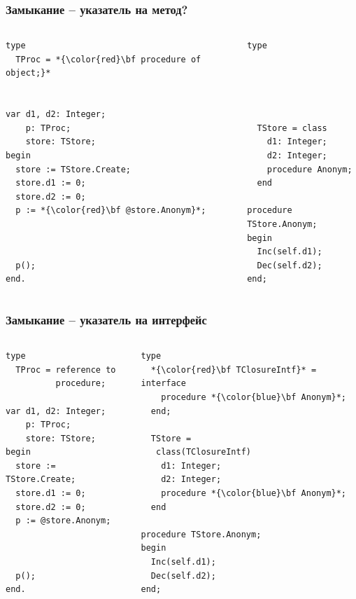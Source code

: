 \documentclass[roman,12pt]{beamer}
\begin{document}
\begin{frame}[fragile]
  \frametitle{Замыкание -- указатель на метод?}
  \begin{columns}[c]
    \column{2.2in}
     \begin{lstlisting}[escapechar=*,basicstyle=\footnotesize]
type
  TProc = *{\color{red}\bf procedure of object;}*


var d1, d2: Integer;
    p: TProc;
    store: TStore;
begin
  store := TStore.Create;
  store.d1 := 0;
  store.d2 := 0;
  p := *{\color{red}\bf @store.Anonym}*;



  p();
end.
     \end{lstlisting}
   \column{2.2in}
     \begin{lstlisting}[escapechar=@,basicstyle=\footnotesize]  
type





  TStore = class
    d1: Integer;
    d2: Integer;
    procedure Anonym;
  end
  
procedure TStore.Anonym;
begin
  Inc(self.d1);
  Dec(self.d2);
end;

     \end{lstlisting}

  \end{columns}
\end{frame}

\begin{frame}[fragile]
  \frametitle{Замыкание -- указатель на интерфейс}
  \begin{columns}[c]
    \column{2.2in}
     \begin{lstlisting}[escapechar=*,basicstyle=\footnotesize]
type
  TProc = reference to
          procedure;

var d1, d2: Integer;
    p: TProc;
    store: TStore;
begin
  store := TStore.Create;
  store.d1 := 0;
  store.d2 := 0;
  p := @store.Anonym;



  p();
end.
     \end{lstlisting}
   \column{2.2in}
     \begin{lstlisting}[escapechar=*,basicstyle=\footnotesize]  
type
  *{\color{red}\bf TClosureIntf}* = interface
    procedure *{\color{blue}\bf Anonym}*;
  end;

  TStore =
   class(TClosureIntf)
    d1: Integer;
    d2: Integer;
    procedure *{\color{blue}\bf Anonym}*;
  end
  
procedure TStore.Anonym;
begin
  Inc(self.d1);
  Dec(self.d2);
end;

     \end{lstlisting}

  \end{columns}
\end{frame}
\end{document}

